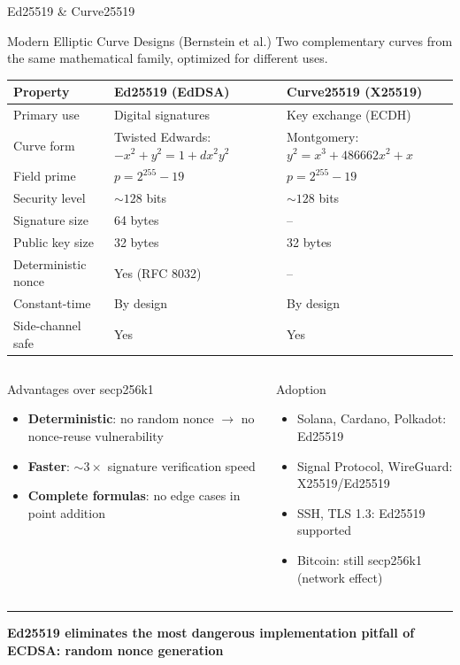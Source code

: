 \documentclass[8pt,aspectratio=169]{beamer}
\newcommand{\bottomnote}[1]{\vfill\vspace{-2mm}\textcolor{mllavender2}{\rule{\textwidth}{0.4pt}}\vspace{1mm}\footnotesize\textbf{#1}}
\begin{document}
\begin{frame}{Ed25519 \& Curve25519}
\begin{block}{Modern Elliptic Curve Designs (Bernstein et al.)}
\small Two complementary curves from the same mathematical family, optimized for different uses.
\end{block}
\vspace{2mm}
\begin{center}
\small
\begin{tabular}{lll}
\toprule
\textbf{Property} & \textbf{Ed25519 (EdDSA)} & \textbf{Curve25519 (X25519)} \\
\midrule
Primary use & Digital signatures & Key exchange (ECDH) \\
Curve form & Twisted Edwards: $-x^2+y^2=1+dx^2y^2$ & Montgomery: $y^2=x^3+486662x^2+x$ \\
Field prime & $p = 2^{255} - 19$ & $p = 2^{255} - 19$ \\
Security level & $\sim 128$ bits & $\sim 128$ bits \\
Signature size & 64 bytes & -- \\
Public key size & 32 bytes & 32 bytes \\
Deterministic nonce & Yes (RFC 8032) & -- \\
Constant-time & By design & By design \\
Side-channel safe & Yes & Yes \\
\bottomrule
\end{tabular}
\end{center}
\vspace{2mm}
\begin{columns}
\begin{block}{Advantages over secp256k1}
\begin{itemize}\small
  \item \textbf{Deterministic}: no random nonce $\to$ no nonce-reuse vulnerability
  \item \textbf{Faster}: $\sim 3\times$ signature verification speed
  \item \textbf{Complete formulas}: no edge cases in point addition
\end{itemize}
\end{block}
\begin{block}{Adoption}
\begin{itemize}\small
  \item Solana, Cardano, Polkadot: Ed25519
  \item Signal Protocol, WireGuard: X25519/Ed25519
  \item SSH, TLS 1.3: Ed25519 supported
  \item Bitcoin: still secp256k1 (network effect)
\end{itemize}
\end{block}
\end{columns}
\bottomnote{Ed25519 eliminates the most dangerous implementation pitfall of ECDSA: random nonce generation}
\end{frame}
\end{document}
